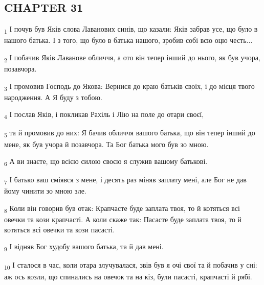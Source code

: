 \subsection{CHAPTER 31}
\begin{tcolorbox}
\textsubscript{1} І почув був Яків слова Лаванових синів, що казали: Яків забрав усе, що було в нашого батька. І з того, що було в батька нашого, зробив собі всю оцю честь...
\end{tcolorbox}
\begin{tcolorbox}
\textsubscript{2} І побачив Яків Лаванове обличчя, а ото він тепер інший до нього, як був учора, позавчора.
\end{tcolorbox}
\begin{tcolorbox}
\textsubscript{3} І промовив Господь до Якова: Вернися до краю батьків своїх, і до місця твого народження. А Я буду з тобою.
\end{tcolorbox}
\begin{tcolorbox}
\textsubscript{4} І послав Яків, і покликав Рахіль і Лію на поле до отари своєї,
\end{tcolorbox}
\begin{tcolorbox}
\textsubscript{5} та й промовив до них: Я бачив обличчя вашого батька, що він тепер інший до мене, як був учора й позавчора. Та Бог батька мого був зо мною.
\end{tcolorbox}
\begin{tcolorbox}
\textsubscript{6} А ви знаєте, що всією силою своєю я служив вашому батькові.
\end{tcolorbox}
\begin{tcolorbox}
\textsubscript{7} І батько ваш сміявся з мене, і десять раз міняв заплату мені, але Бог не дав йому чинити зо мною зле.
\end{tcolorbox}
\begin{tcolorbox}
\textsubscript{8} Коли він говорив був отак: Крапчасте буде заплата твоя, то й котяться всі овечки та кози крапчасті. А коли скаже так: Пасасте буде заплата твоя, то й котяться всі овечки та кози пасасті.
\end{tcolorbox}
\begin{tcolorbox}
\textsubscript{9} І відняв Бог худобу вашого батька, та й дав мені.
\end{tcolorbox}
\begin{tcolorbox}
\textsubscript{10} І сталося в час, коли отара злучувалася, звів був я очі свої та й побачив у сні: аж ось козли, що спинались на овечок та на кіз, були пасасті, крапчасті й рябі.
\end{tcolorbox}
